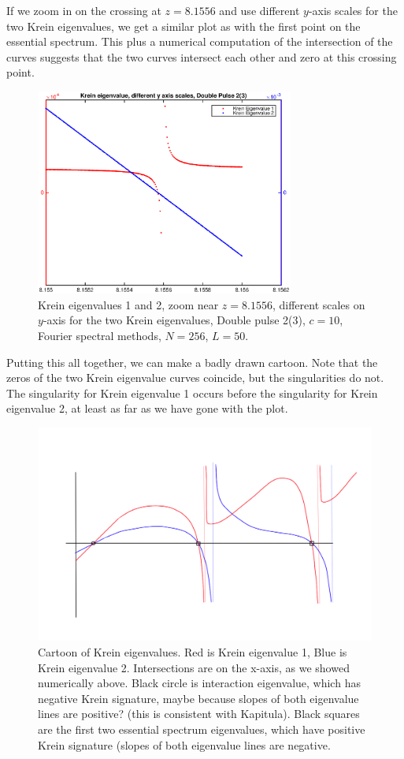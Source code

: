 \documentclass[12pt]{article}
\begin{document}
If we zoom in on the crossing at $z = 8.1556$ and use different $y$-axis scales for the two Krein eigenvalues, we get a similar plot as with the first point on the essential spectrum. This plus a numerical computation of the intersection of the curves suggests that the two curves intersect each other and zero at this crossing point.

\begin{figure}[H]
	\includegraphics[width=8.5cm]{dp2kreineigsingnear8diffy.eps}
	\caption{Krein eigenvalues 1 and 2, zoom near $z = 8.1556$, different scales on $y$-axis for the two Krein eigenvalues, Double pulse 2(3), $c = 10$, Fourier spectral methods, $N = 256$, $L = 50$. }
\end{figure}

Putting this all together, we can make a badly drawn cartoon. Note that the zeros of the two Krein eigenvalue curves coincide, but the singularities do not. The singularity for Krein eigenvalue 1 occurs before the singularity for Krein eigenvalue 2, at least as far as we have gone with the plot.

\begin{figure}[H]
	\includegraphics[width=15cm]{kreineigcartoon3.png}
	\caption{Cartoon of Krein eigenvalues. Red is Krein eigenvalue 1, Blue is Krein eigenvalue 2. Intersections are on the x-axis, as we showed numerically above. Black circle is interaction eigenvalue, which has negative Krein signature, maybe because slopes of both eigenvalue lines are positive? (this is consistent with Kapitula). Black squares are the first two essential spectrum eigenvalues, which have positive Krein signature (slopes of both eigenvalue lines are negative.}
\end{figure}
\end{document}

